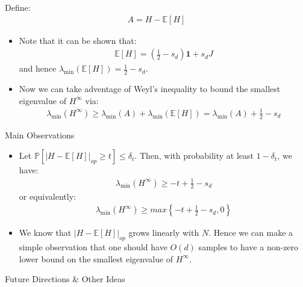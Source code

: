 \documentclass[serif, aspectratio=169]{beamer}
\begin{document}
\begin{frame}
	Define:
	\begin{align*}
		A = H - \mathbb{E}[H] 
	\end{align*}
	\begin{itemize}
		\item Note that it can be shown that:
		\begin{align*}
			\mathbb{E}[H] = (\frac{1}{2} -s_d) \mathbf{1} + s_d J
		\end{align*}
		and hence \( \lambda_{\min}(\mathbb{E}[H]) = \frac{1}{2} - s_d \).
		\item Now we can take adventage of Weyl's inequality to bound the smallest eigenvalue of \(H^\infty\) via:
			\begin{align*}
				\lambda_{\min}(H^\infty) \geq \lambda_{\min}(A) + \lambda_{\min}(\mathbb{E}[H]) = \lambda_{\min}(A) + \frac{1}{2} - s_d
			\end{align*}
	\end{itemize}
\end{frame}

\begin{frame}{Main Observations}
	\begin{itemize}

		\item 	Let \( \mathbb{P} \left[ \lvert H - \mathbb{E}[H] \rvert_{op} \geq t \right] \leq \delta_t \). Then, with probability at least \( 1 - \delta_t \), we have:
		\begin{align*}
			\lambda_{\min}(H^\infty) \geq -t + \frac{1}{2} - s_d
		\end{align*}
		or equivalently:
		\begin{align*}
			\lambda_{\min}(H^\infty) \geq max \left\{ -t + \frac{1}{2} - s_d, 0 \right\}
		\end{align*}
		\item We know that \( \lvert H - \mathbb{E}[H] \rvert_{op} \) grows linearly with \( N \). Hence we can make a simple observation that one should have $O(d)$ samples to have a non-zero lower bound on the smallest eigenvalue of \(H^\infty\).
	\end{itemize}


	
\end{frame}



\begin{frame}{Future Directions \& Other Ideas}
	
\end{frame}
\end{document}

